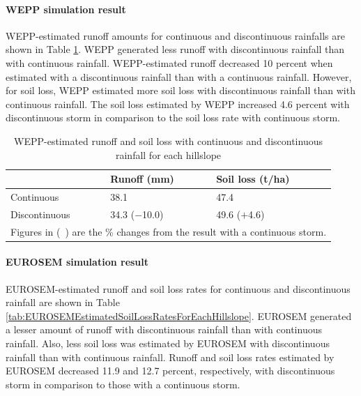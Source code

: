\paragraph{WEPP simulation result} WEPP-estimated runoff amounts for continuous
and discontinuous rainfalls are shown in Table
\ref{tab:EstimatedRunoffForEachHillslope}. WEPP generated less runoff with
discontinuous rainfall than with continuous rainfall. WEPP-estimated runoff
decreased 10 percent when estimated with a discontinuous rainfall than with a
continuous rainfall. However, for soil loss, WEPP estimated more soil loss with
discontinuous rainfall than with continuous rainfall. The soil loss estimated by
WEPP increased 4.6 percent with discontinuous storm in comparison to the soil
loss rate with continuous storm.

\begin{table}[hbtp]
  \centering
  \caption{WEPP-estimated runoff and soil loss with continuous and discontinuous
rainfall for each hillslope}
  \label{tab:EstimatedRunoffForEachHillslope}
    \begin{tabular}{lll}
      \toprule
      & Runoff (mm)& Soil loss (t/ha) \\
      \midrule
      Continuous & 38.1 & 47.4 \\
      Discontinuous & 34.3 ($-$10.0) & 49.6 ($+$4.6)\\
      \bottomrule
      \multicolumn{3}{l}{\footnotesize Figures in (\ ) are the \% changes from
the result with a continuous storm.}
    \end{tabular}
\end{table}

\paragraph{EUROSEM simulation result} EUROSEM-estimated runoff and soil loss
rates for continuous and discontinuous rainfall are shown in Table
\ref{tab:EUROSEMEstimatedSoilLossRatesForEachHillslope}. EUROSEM generated a
lesser amount of runoff with discontinuous rainfall than with continuous
rainfall. Also, less soil loss was estimated by EUROSEM with discontinuous
rainfall than with continuous rainfall. Runoff and soil loss rates estimated
by EUROSEM decreased 11.9 and 12.7 percent, respectively, with discontinuous
storm in comparison to those with a continuous storm.

